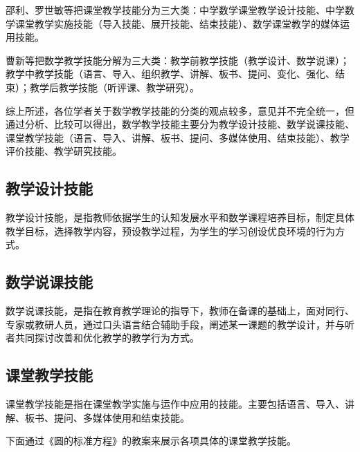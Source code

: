 邵利、罗世敏等把课堂教学技能分为三大类：中学数学课堂教学设计技能、中学数学课堂教学实施技能（导入技能、展开技能、结束技能）、数学课堂教学的媒体运用技能\cite{罗世敏中学数学课堂教学技能实训教程}。

曹新等把数学教学技能分解为三大类：教学前教学技能（教学设计、数学说课）；教学中教学技能（语言、导入、组织教学、讲解、板书、提问、变化、强化、结束）；教学后教学技能（听评课、教学研究）\cite{曹新数学教学技能学习教程}。

综上所述，各位学者关于数学教学技能的分类的观点较多，意见并不完全统一，但通过分析、比较可以得出，数学教学技能主要分为教学设计技能、数学说课技能、课堂教学技能（语言、导入、讲解、板书、提问、多媒体使用、结束技能）、教学评价技能、教学研究技能。


\subsection{教学设计技能}

教学设计技能，是指教师依据学生的认知发展水平和数学课程培养目标，制定具体教学目标\cite{曹新数学教学技能学习教程}，选择教学内容，预设教学过程，为学生的学习创设优良环境的行为方式。


\subsection{数学说课技能}

数学说课技能，是指在教育教学理论的指导下，教师在备课的基础上，面对同行、专家或教研人员，通过口头语言结合辅助手段，阐述某一课题的教学设计，并与听者共同探讨改善和优化教学的教学行为方式\cite{曹新数学教学技能学习教程}。


\subsection{课堂教学技能}

课堂教学技能是指在课堂教学实施与运作中应用的技能。主要包括语言、导入、讲解、板书、提问、多媒体使用和结束技能。

下面通过《圆的标准方程》的教案来展示各项具体的课堂教学技能。

